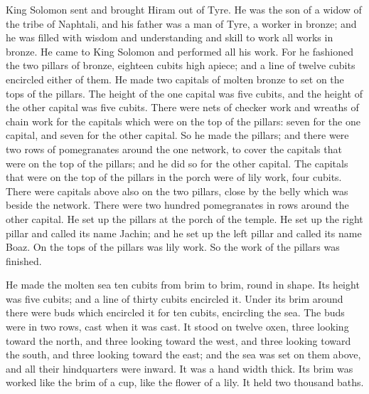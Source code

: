 \myverse{}King Solomon sent and brought Hiram out of Tyre.
\myverse{}He was the son of a widow of the tribe of Naphtali, and his father was a man
of Tyre, a worker in bronze; and he was filled with wisdom and understanding and skill to work all works
in bronze. He came to King Solomon and performed all his work.
\myverse{}For he fashioned the two pillars of bronze, eighteen cubits high apiece; and
a line of twelve cubits encircled either of them.
\myverse{}He made two capitals of molten bronze to set on the tops of the pillars. The
height of the one capital was five cubits, and the height of the other capital was five cubits.
\myverse{}There were nets of checker work and wreaths of chain work for the capitals
which were on the top of the pillars: seven for the one capital, and seven for the other capital.
\myverse{}So he made the pillars; and there were two rows of pomegranates around the
one network, to cover the capitals that were on the top of the pillars; and he did so for the other capital.
\myverse{}The capitals that were on the top of the pillars in the porch were of lily
work, four cubits.
\myverse{}There were capitals above also on the two pillars, close by the belly which
was beside the network. There were two hundred pomegranates in rows around the other capital.
\myverse{}He set up the pillars at the porch of the temple. He set up the right pillar
and called its name Jachin; and he set up the left pillar and called its name Boaz.
\myverse{}On the tops of the pillars was lily work. So the work of the pillars was finished.

\myverse{}He made the molten sea ten cubits from brim to brim, round in
shape. Its height was five cubits; and a line of thirty cubits encircled it.
\myverse{}Under its brim around there were buds which encircled it for ten cubits, encircling
the sea. The buds were in two rows, cast when it was cast.
\myverse{}It stood on twelve oxen, three looking toward the north, and three looking
toward the west, and three looking toward the south, and three looking toward the east; and the sea was
set on them above, and all their hindquarters were inward.
\myverse{}It was a hand width thick. Its brim was worked like the brim of a cup, like
the flower of a lily. It held two thousand baths.

